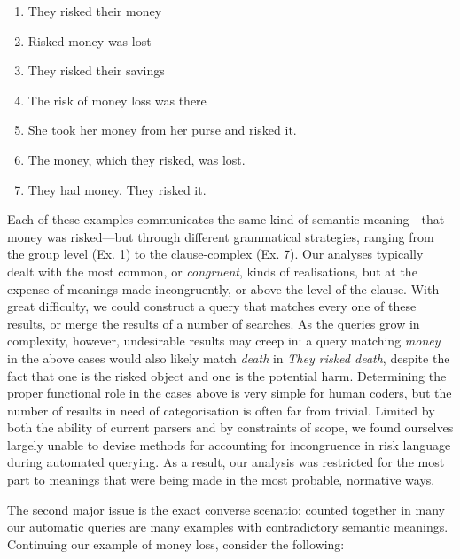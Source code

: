         \begin{enumerate} [before=\itshape,font=\normalfont] \setlength\itemsep{0em} \small
            \item They risked their money
            \item Risked money was lost
            \item They risked their savings
            \item The risk of money loss was there
            \item She took her money from her purse and risked it.
            \item The money, which they risked, was lost.
            \item They had money. They risked it.
        \end{enumerate}
        Each of these examples communicates the same kind of semantic meaning---that money was risked---but through different grammatical strategies, ranging from the group level (Ex. 1) to the clause-complex (Ex. 7). Our analyses typically dealt with the most common, or \emph{congruent}, kinds of realisations, but at the expense of meanings made incongruently, or above the level of the clause. With great difficulty, we could construct a query that matches every one of these results, or merge the results of a number of searches. As the queries grow in complexity, however, undesirable results may creep in: a query matching \emph{money} in the above cases would also likely match \emph{death} in \emph{They risked death}, despite the fact that one is the risked object and one is the potential harm. Determining the proper functional role in the cases above is very simple for human coders, but the number of results in need of categorisation is often far from trivial. Limited by both the ability of current parsers and by constraints of scope, we found ourselves largely unable to devise methods for accounting for incongruence in risk language during automated querying. As a result, our analysis was restricted for the most part to meanings that were being made in the most probable, normative ways.

        The second major issue is the exact converse scenatio: counted together in many our automatic queries are many examples with contradictory semantic meanings. Continuing our example of money loss, consider the following:

